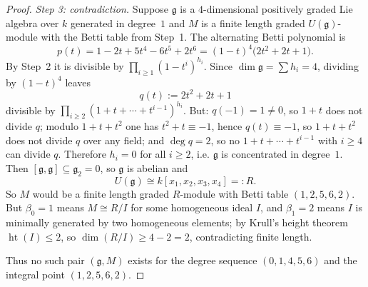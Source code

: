 \documentclass[10pt,a4paper]{amsart}
\begin{document}
\begin{proof}
\smallskip
\noindent\emph{Step 3: contradiction.} Suppose $\mathfrak g$ is a
$4$-dimensional positively graded Lie algebra over $k$ generated in
degree~$1$ and $M$ is a finite length graded $U(\mathfrak g)$-module with
the Betti table from Step~1. The alternating Betti polynomial is
\[
   p(t)=1-2t+5t^4-6t^5+2t^6=(1-t)^4\bigl(2t^2+2t+1\bigr).
\]
By Step~2 it is divisible by $\prod_{i\ge 1}(1-t^i)^{h_i}$. Since
$\dim\mathfrak g=\sum h_i=4$, dividing by $(1-t)^4$ leaves
\[
   q(t):=2t^2+2t+1
\]
divisible by $\prod_{i\ge 2}(1+t+\cdots+t^{i-1})^{h_i}$. But:
$q(-1)=1\ne 0$, so $1+t$ does not divide $q$; modulo $1+t+t^2$ one has
$t^2+t\equiv -1$, hence $q(t)\equiv -1$, so $1+t+t^2$ does not divide
$q$ over any field; and $\deg q=2$, so no $1+t+\cdots+t^{i-1}$ with
$i\ge 4$ can divide $q$. Therefore $h_i=0$ for all $i\ge 2$, i.e.
$\mathfrak g$ is concentrated in degree~$1$. Then
$[\mathfrak g,\mathfrak g]\subseteq\mathfrak g_2=0$, so $\mathfrak g$ is
abelian and
\[
   U(\mathfrak g)\cong k[x_1,x_2,x_3,x_4]=:R.
\]
So $M$ would be a finite length graded $R$-module with Betti table
$(1,2,5,6,2)$. But $\beta_0=1$ means $M\cong R/I$ for some homogeneous
ideal $I$, and $\beta_1=2$ means $I$ is minimally generated by two
homogeneous elements; by Krull's height theorem $\operatorname{ht}(I)\le 2$,
so $\dim(R/I)\ge 4-2=2$, contradicting finite length.

Thus no such pair $(\mathfrak g,M)$ exists for the degree sequence
$(0,1,4,5,6)$ and the integral point $(1,2,5,6,2)$.
\end{proof}
\end{document}
